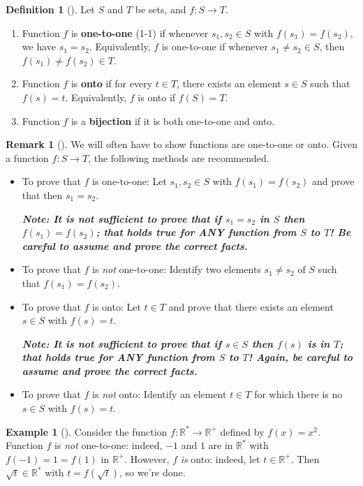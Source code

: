 \documentclass[10pt,openany,oneside]{book}
\newcommand{\alert}[1]{\textbf{\textit{#1}}}
\newcommand{\terminology}[1]{\textbf{#1}}
\theoremstyle{plain}
\theoremstyle{definition}
\newtheorem{definition}[theorem]{Definition}
\theoremstyle{definition}
\newtheorem{remark}[theorem]{Remark}
\theoremstyle{definition}
\newtheorem{example}[theorem]{Example}
\theoremstyle{definition}
\numberwithin{equation}{section}
\def\R{\mathbb{R}}
\begin{document}
\begin{definition}[{}]\label{definition-9}
Let \(S\) and \(T\) be sets, and \(f:S\to T\). \leavevmode%
\begin{enumerate}
\item\hypertarget{li-9}{}Function \(f\) is \terminology{one-to-one} (1-1) if whenever \(s_1, s_2\in S\) with \(f(s_1)=f(s_2)\), we have \(s_1=s_2\).  Equivalently, \(f\) is one-to-one if whenever \(s_1\neq s_2 \in S\), then \(f(s_1)\neq f(s_2) \in T\).%
\item\hypertarget{li-10}{}Function \(f\) is \terminology{onto} if for every \(t\in T\), there exists an element \(s\in S\) such that \(f(s)=t\).  Equivalently, \(f\) is onto if \(f(S)=T\).%
\item\hypertarget{li-11}{}Function \(f\) is a \terminology{bijection} if it is both one-to-one and onto.%
\end{enumerate}
%
\end{definition}
\begin{remark}[]\label{remark-2}
We will often have to show functions are one-to-one or onto. Given a function \(f:S\to T\), the following methods are recommended. \leavevmode%
\begin{itemize}[label=\textbullet]
\item{}To prove that \(f\) is one-to-one: Let \(s_1,s_2 \in S\) with \(f(s_1)=f(s_2)\) and prove that then \(s_1=s_2\).%
\par
\alert{Note: It is \emph{not} sufficient to prove that if \(s_1=s_2\) in \(S\) then \(f(s_1)=f(s_2)\); that holds true for ANY function from \(S\) to \(T\)!  Be careful to \emph{assume} and \emph{prove} the correct facts.}%
\item{}To prove that \(f\) is \emph{not} one-to-one: Identify two elements \(s_1 \neq s_2\) of \(S\) such that \(f(s_1)=f(s_2)\).%
\item{}To prove that \(f\) is onto: Let \(t\in T\) and prove that there exists an element \(s\in S\) with \(f(s)=t\).%
\par
\alert{Note: It is \emph{not} sufficient to prove that if \(s\in S\) then \(f(s)\) is in \(T\); that holds true for ANY function from \(S\) to \(T\)!  Again, be careful to \emph{assume} and \emph{prove} the correct facts.}%
\item{}To prove that \(f\) is \emph{not} onto: Identify an element \(t\in T\) for which there is no \(s\in S\) with \(f(s)=t\).%
\end{itemize}
%
\end{remark}
\begin{example}[]\label{example-6}
Consider the function \(f: \R^* \to \R^+\) defined by \(f(x)=x^2\). Function \(f\) is \emph{not} one-to-one: indeed, \(-1\) and \(1\) are in \(\R^*\) with \(f(-1)=1=f(1)\) in \(\R^+\). However, \(f\) \emph{is} onto: indeed, let \(t\in \R^+\). Then \(\sqrt{t} \in \R^*\) with \(t=f(\sqrt{t})\), so we're done.%
\end{example}
\end{document}
